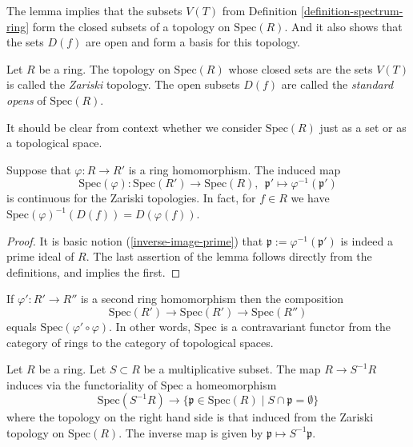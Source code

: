 \noindent
The lemma implies that the subsets $V(T)$ from
Definition \ref{definition-spectrum-ring} form the closed
subsets of a topology on $\text{Spec}(R)$. And it also shows that
the sets $D(f)$ are open and form a basis for this
topology.

\begin{definition}
\label{definition-Zariski-topology}
Let $R$ be a ring.
The topology on $\text{Spec}(R)$ whose closed sets are the
sets $V(T)$ is called the {\it Zariski} topology. The open
subsets $D(f)$ are called the {\it standard opens} of $\text{Spec}(R)$.
\end{definition}

\noindent
It should be clear from context whether we consider $\text{Spec}(R)$
just as a set or as a topological space.

\begin{lemma}
\label{lemma-spec-functorial}
Suppose that $\varphi : R \to R'$ is a ring homomorphism.
The induced map
$$
\text{Spec}(\varphi) :
\text{Spec}(R')
\longrightarrow
\text{Spec}(R),\ \ 
\mathfrak p'
\longmapsto
\varphi^{-1}(\mathfrak p')
$$
is continuous for the Zariski topologies. In fact, for
$f \in R$ we have
$\text{Spec}(\varphi)^{-1}(D(f)) = D(\varphi(f))$.
\end{lemma}

\begin{proof}
It is basic notion (\ref{inverse-image-prime}) that
$\mathfrak p := \varphi^{-1}(\mathfrak p')$
is indeed a prime ideal of $R$. The last assertion
of the lemma follows directly from the definitions,
and implies the first.
\end{proof}

\noindent
If $\varphi' : R' \to R''$ is a second ring homomorphism
then the composition
$$
\text{Spec}(R')
\longrightarrow
\text{Spec}(R')
\longrightarrow
\text{Spec}(R'')
$$
equals $\text{Spec}(\varphi' \circ \varphi)$. In other
words, $\text{Spec}$ is a contravariant functor from the
category of rings to the category of topological spaces.

\begin{lemma}
\label{lemma-spec-localization}
Let $R$ be a ring. Let $S \subset R$ be a multiplicative subset.
The map $R \to S^{-1}R$ induces via the functoriality of $\text{Spec}$
a homeomorphism 
$$
\text{Spec}(S^{-1}R)
\longrightarrow 
\{\mathfrak p \in \text{Spec}(R) \mid S \cap \mathfrak p = \emptyset \}
$$
where the topology on the right hand side is that induced from the
Zariski topology on $\text{Spec}(R)$. The inverse map is given
by $\mathfrak p \mapsto S^{-1}\mathfrak p$.
\end{lemma}

